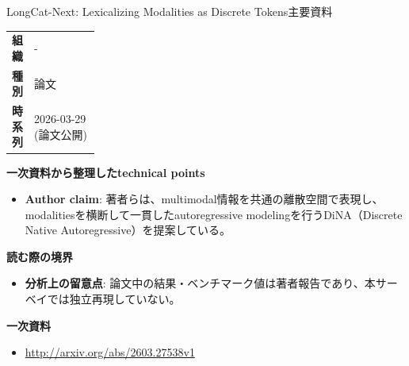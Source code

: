 \begin{technicalnote}{LongCat-Next: Lexicalizing Modalities as Discrete Tokens}{主要資料}
\begingroup
\begin{tabularx}{\linewidth}{@{}>{\bfseries}p{0.22\linewidth}X@{}}
組織 & - \\
種別 & 論文 \\
時系列 & 2026-03-29 (論文公開) \\
\end{tabularx}
\smallskip
{\bfseries 一次資料から整理したtechnical points}
\begin{itemize}[leftmargin=1.5em,itemsep=0.35em]
\item \textbf{Author claim}: 著者らは、multimodal情報を共通の離散空間で表現し、modalitiesを横断して一貫したautoregressive modelingを行うDiNA（Discrete Native Autoregressive）を提案している。
\end{itemize}
\begin{minipage}{\linewidth}
{\bfseries 読む際の境界}
\begin{itemize}[leftmargin=1.5em,itemsep=0.35em]
\item \textbf{分析上の留意点}: 論文中の結果・ベンチマーク値は著者報告であり、本サーベイでは独立再現していない。
\end{itemize}
\begin{samepage}
{\bfseries 一次資料}
\begingroup\sloppy
\begin{itemize}[leftmargin=1.5em,itemsep=0.25em]
\item {\scriptsize\url{http://arxiv.org/abs/2603.27538v1}}
\end{itemize}
\endgroup
\end{samepage}
\end{minipage}
\endgroup
\end{technicalnote}
\medskip

